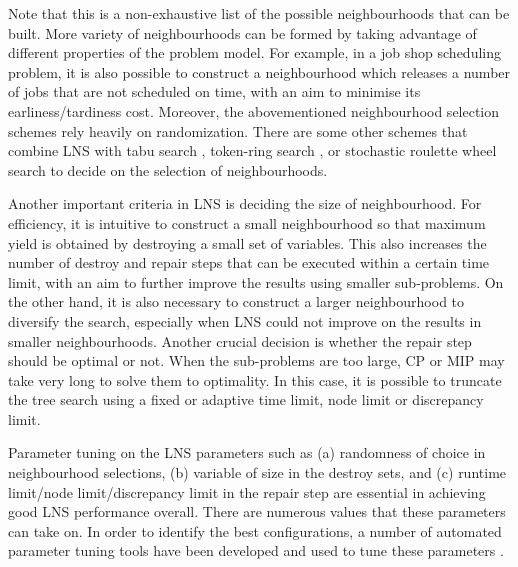 Note that this is a non-exhaustive list of the possible neighbourhoods that can be built. More variety of neighbourhoods can be formed by taking advantage of different properties of the problem model. For example, in a job shop scheduling problem, it is also possible to construct a neighbourhood which releases a number of jobs that are not scheduled on time, with an aim to minimise its earliness/tardiness cost. %
Moreover, the abovementioned neighbourhood selection schemes rely heavily on randomization. There are some other schemes that combine LNS with tabu search \citep{abdullah2007tabu}, token-ring search \citep{di2002multi}, or stochastic roulette wheel search \citep{pisinger2007general} to decide on the selection of neighbourhoods.


Another important criteria in LNS is deciding the size of neighbourhood. For efficiency, it is intuitive to construct a small neighbourhood so that maximum yield is obtained by destroying a small set of variables. This also increases the number of destroy and repair steps that can be executed within a certain time limit, with an aim to further improve the results using smaller sub-problems. On the other hand, it is also necessary to construct a larger neighbourhood to diversify the search, especially when LNS could not improve on the results in smaller neighbourhoods. Another crucial decision is whether the repair step should be optimal or not. When the sub-problems are too large, CP or MIP may take very long to solve them to optimality. In this case, it is possible to truncate the tree search using a fixed or adaptive time limit, node limit or discrepancy limit.

Parameter tuning on the LNS parameters such as (a) randomness of choice in neighbourhood selections, (b) variable of size in the destroy sets, and (c) runtime limit/node limit/discrepancy limit in the repair step are essential in achieving good LNS performance overall. There are numerous values that these parameters can take on. In order to identify the best configurations, a number of automated parameter tuning tools have been developed and used to tune these parameters \citep{hutter2011sequential,malitsky2013tuning}.


